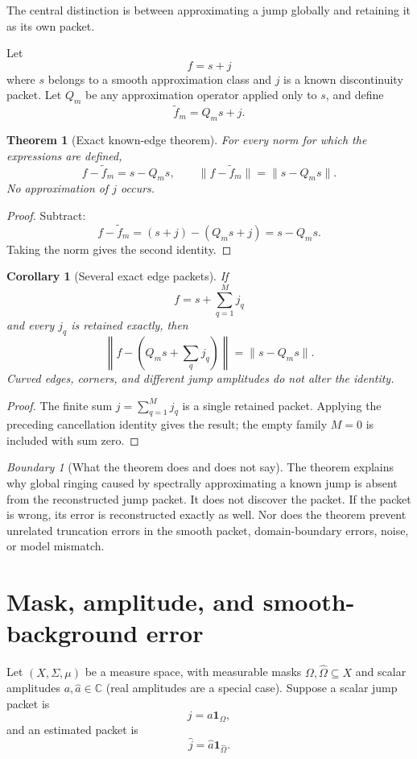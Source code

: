 \documentclass[11pt,letterpaper]{article}
\newtheorem{theorem}{Theorem}[section]
\theoremstyle{plain}
\theoremstyle{plain}
\theoremstyle{plain}
\newtheorem{corollary}[corollary]{Corollary}
\theoremstyle{definition}
\theoremstyle{definition}
\theoremstyle{definition}
\theoremstyle{definition}
\theoremstyle{remark}
\theoremstyle{remark}
\newtheorem{boundary}[boundary]{Boundary}
\theoremstyle{remark}
\theoremstyle{remark}
\newcommand{\bbC}{\mathbb C}
\let\KomorebiPrimitiveWidehat\widehat
\renewcommand{\widehat}[1]{\KomorebiPrimitiveWidehat{#1}}
\begin{document}
The central distinction is between approximating a jump globally and retaining it as its own packet.

Let
\[
f=s+j
\]
where $s$ belongs to a smooth approximation class and $j$ is a known discontinuity packet. Let $Q_m$ be any approximation operator applied only to $s$, and define
\[
\widetilde f_m=Q_ms+j.
\]

\begin{theorem}[Exact known-edge theorem]\label{result:10}
For every norm for which the expressions are defined,
\[
\boxed{
f-\widetilde f_m=s-Q_ms,
\qquad
\|f-\widetilde f_m\|=\|s-Q_ms\|.
}
\]
No approximation of $j$ occurs.
\end{theorem}

\begin{proof}
Subtract:
\[
f-\widetilde f_m=(s+j)-(Q_ms+j)=s-Q_ms.
\]
Taking the norm gives the second identity.
\end{proof}

\begin{corollary}[Several exact edge packets]\label{result:11}
If
\[
f=s+\sum_{q=1}^{M}j_q
\]
and every $j_q$ is retained exactly, then
\[
\left\|f-\left(Q_ms+\sum_qj_q\right)\right\|
=\|s-Q_ms\|.
\]
Curved edges, corners, and different jump amplitudes do not alter the identity.
\end{corollary}
\begin{proof}
The finite sum $j=\sum_{q=1}^M j_q$ is a single retained packet. Applying the preceding cancellation identity gives the result; the empty family $M=0$ is included with sum zero.
\end{proof}

\begin{boundary}[What the theorem does and does not say]\label{core:record:15}
The theorem explains why global ringing caused by spectrally approximating a known jump is absent from the reconstructed jump packet. It does not discover the packet. If the packet is wrong, its error is reconstructed exactly as well. Nor does the theorem prevent unrelated truncation errors in the smooth packet, domain-boundary errors, noise, or model mismatch.
\end{boundary}

\section{Mask, amplitude, and smooth-background error}\label{core:section:07}

Let $(X,\Sigma,\mu)$ be a measure space, with measurable masks $\Omega,\widehat\Omega\subseteq X$ and scalar amplitudes $a,\widehat a\in\bbC$ (real amplitudes are a special case). Suppose a scalar jump packet is
\[
j=a\mathbf 1_{\Omega},
\]
and an estimated packet is
\[
\widehat j=\widehat a\mathbf 1_{\widehat\Omega}.
\]
\end{document}
